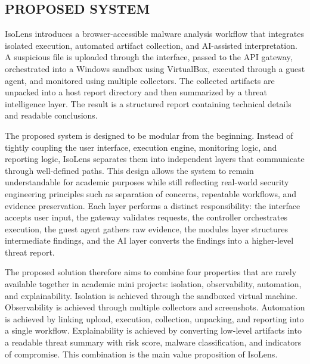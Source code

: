 \documentclass[a4paper,12pt,oneside]{report}
\begin{document}
\subsection{PROPOSED SYSTEM}
IsoLens introduces a browser-accessible malware analysis workflow that integrates isolated execution, automated artifact collection, and AI-assisted interpretation. A suspicious file is uploaded through the interface, passed to the API gateway, orchestrated into a Windows sandbox using VirtualBox, executed through a guest agent, and monitored using multiple collectors. The collected artifacts are unpacked into a host report directory and then summarized by a threat intelligence layer. The result is a structured report containing technical details and readable conclusions.

\par

\par

The proposed system is designed to be modular from the beginning. Instead of tightly coupling the user interface, execution engine, monitoring logic, and reporting logic, IsoLens separates them into independent layers that communicate through well-defined paths. This design allows the system to remain understandable for academic purposes while still reflecting real-world security engineering principles such as separation of concerns, repeatable workflows, and evidence preservation. Each layer performs a distinct responsibility: the interface accepts user input, the gateway validates requests, the controller orchestrates execution, the guest agent gathers raw evidence, the modules layer structures intermediate findings, and the AI layer converts the findings into a higher-level threat report.

\par

\par

The proposed solution therefore aims to combine four properties that are rarely available together in academic mini projects: isolation, observability, automation, and explainability. Isolation is achieved through the sandboxed virtual machine. Observability is achieved through multiple collectors and screenshots. Automation is achieved by linking upload, execution, collection, unpacking, and reporting into a single workflow. Explainability is achieved by converting low-level artifacts into a readable threat summary with risk score, malware classification, and indicators of compromise. This combination is the main value proposition of IsoLens.
\end{document}
